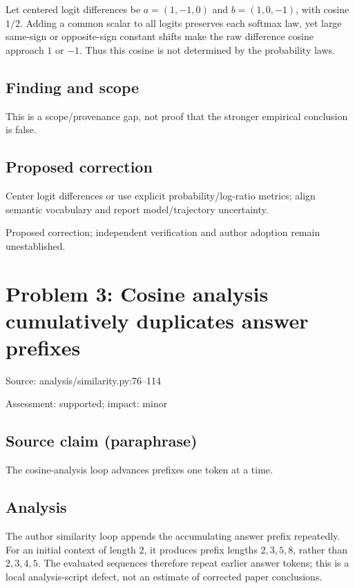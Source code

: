\documentclass[11pt]{article}
\begin{document}
Let centered logit differences be \(a=(1,-1,0)\) and \(b=(1,0,-1)\), with cosine \(1/2\). Adding a common scalar to all logits preserves each softmax law, yet large same-sign or opposite-sign constant shifts make the raw difference cosine approach \(1\) or \(-1\). Thus this cosine is not determined by the probability laws.

\subsection*{Finding and scope}

This is a scope/provenance gap, not proof that the stronger empirical conclusion is false.

\subsection*{Proposed correction}

Center logit differences or use explicit probability/log-ratio metrics; align semantic vocabulary and report model/trajectory uncertainty.

Proposed correction; independent verification and author adoption remain unestablished.

\section*{Problem 3: Cosine analysis cumulatively duplicates answer prefixes}

Source: analysis/similarity.py:76–114

Assessment: supported; impact: minor

\subsection*{Source claim (paraphrase)}

The cosine-analysis loop advances prefixes one token at a time.

\subsection*{Analysis}

The author similarity loop appends the accumulating answer prefix repeatedly. For an initial context of length \(2\), it produces prefix lengths \(2,3,5,8\), rather than \(2,3,4,5\). The evaluated sequences therefore repeat earlier answer tokens; this is a local analysis-script defect, not an estimate of corrected paper conclusions.
\end{document}
